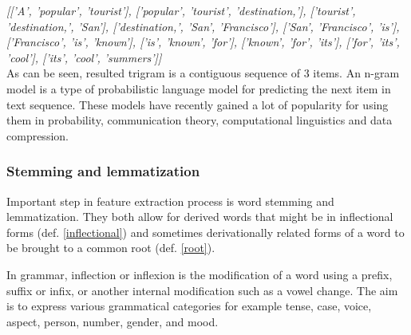 \textit{[['A', 'popular', 'tourist'], ['popular', 'tourist', 'destination,'], ['tourist', 'destination,', 'San'], ['destination,', 'San', 'Francisco'], ['San', 'Francisco', 'is'], ['Francisco', 'is', 'known'], ['is', 'known', 'for'], ['known', 'for', 'its'], ['for', 'its', 'cool'], ['its', 'cool', 'summers']]}\\

As can be seen, resulted trigram is a contiguous sequence of 3 items. An n-gram model is a type of probabilistic language model for predicting the next item in text sequence. These models have recently gained a lot of popularity for using them in probability, communication theory, computational linguistics and data compression.

\subsubsection{Stemming and lemmatization}
Important step in feature extraction process is word stemming and lemmatization. They both allow for derived words that might be in inflectional forms (def. \ref{inflectional}) and sometimes derivationally related forms of a word to be brought to a common root (def. \ref{root}). \\

 \begin{definition}
 	\label{inflectional}
In grammar, inflection or inflexion is the modification of a word using a prefix, suffix or infix, or another internal modification such as a vowel change. The aim is to express various grammatical categories for example tense, case, voice, aspect, person, number, gender, and mood. \\
\end{definition}

